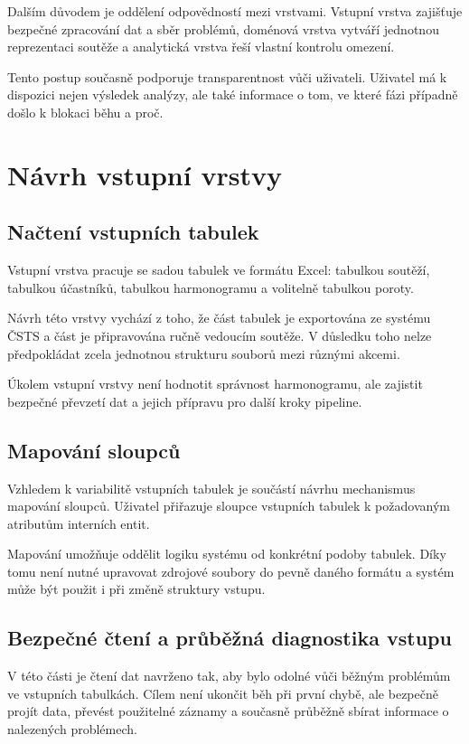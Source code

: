 \documentclass[czech, kiv, ba, he, iso690alph, pdf]{fasthesis}
\begin{document}
				Dalším důvodem je oddělení odpovědností mezi vrstvami. Vstupní vrstva zajišťuje bezpečné zpracování dat a sběr problémů, doménová vrstva vytváří jednotnou reprezentaci soutěže a analytická vrstva řeší vlastní kontrolu omezení.
	
				Tento postup současně podporuje transparentnost vůči uživateli. Uživatel má k dispozici nejen výsledek analýzy, ale také informace o tom, ve které fázi případně došlo k blokaci běhu a proč.
	
		\section{Návrh vstupní vrstvy}
	
			\subsection{Načtení vstupních tabulek}
				Vstupní vrstva pracuje se sadou tabulek ve formátu Excel: tabulkou soutěží, tabulkou účastníků, tabulkou harmonogramu a volitelně tabulkou poroty.
	
				Návrh této vrstvy vychází z toho, že část tabulek je exportována ze systému ČSTS a část je připravována ručně vedoucím soutěže. V důsledku toho nelze předpokládat zcela jednotnou strukturu souborů mezi různými akcemi.
	
				Úkolem vstupní vrstvy není hodnotit správnost harmonogramu, ale zajistit bezpečné převzetí dat a jejich přípravu pro další kroky pipeline.
	
			\subsection{Mapování sloupců}
				Vzhledem k variabilitě vstupních tabulek je součástí návrhu mechanismus mapování sloupců. Uživatel přiřazuje sloupce vstupních tabulek k požadovaným atributům interních entit.
	
				Mapování umožňuje oddělit logiku systému od konkrétní podoby tabulek. Díky tomu není nutné upravovat zdrojové soubory do pevně daného formátu a systém může být použit i při změně struktury vstupu.
	
			\subsection{Bezpečné čtení a průběžná diagnostika vstupu}
				V této části je čtení dat navrženo tak, aby bylo odolné vůči běžným problémům ve vstupních tabulkách. Cílem není ukončit běh při první chybě, ale bezpečně projít data, převést použitelné záznamy a současně průběžně sbírat informace o nalezených problémech.
	
\end{document}
